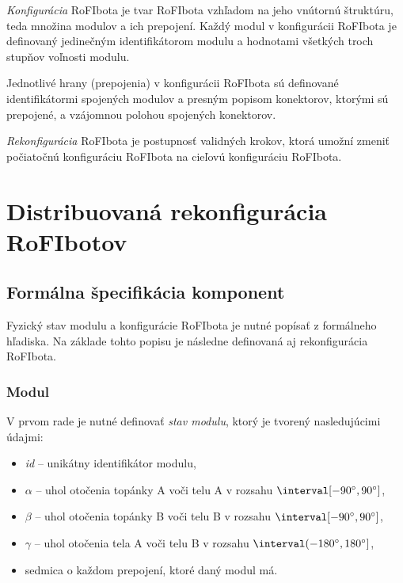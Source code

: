 \documentclass[
  digital, %
  oneside, %
  table,   %
  lof,     %
  nolot,     %
]{fithesis3}
\begin{document}
\textit{Konfigurácia} RoFIbota je tvar RoFIbota vzhľadom na jeho vnútornú štruktúru, teda množina modulov a ich prepojení. Každý modul v konfigurácii RoFIbota je definovaný jedinečným identifikátorom modulu a hodnotami všetkých troch stupňov voľnosti modulu. 

Jednotlivé hrany (prepojenia) v konfigurácii RoFIbota sú definované identifikátormi spojených modulov a presným popisom konektorov, ktorými sú prepojené, a vzájomnou polohou spojených konektorov. 

\textit{Rekonfigurácia} RoFIbota je postupnosť validných krokov, ktorá u\-mož\-ní zmeniť počiatočnú konfiguráciu RoFIbota na cieľovú konfiguráciu RoFIbota. 






\chapter{Distribuovaná rekonfigurácia RoFIbotov}
\section{Formálna špecifikácia komponent}
\label{sec:formalSpec}
Fyzický stav modulu a konfigurácie RoFIbota je nutné popísať z formálneho hľadiska. Na základe tohto popisu je následne definovaná aj rekonfigurácia RoFIbota. 

\subsection{Modul}
\label{sec:formalSpecModul}
V prvom rade je nutné definovať \textit{stav modulu}, ktorý je tvorený nasledujúcimi údajmi: 
\begin{itemize}
    \item \textit{id} -- unikátny identifikátor modulu, 
    \item $\alpha$ -- uhol otočenia topánky A voči telu A v rozsahu $\interval[{-90\degree, 90\degree}]$,
    \item $\beta$ -- uhol otočenia topánky B voči telu B v rozsahu $\interval[{-90\degree, 90\degree}]$,
    \item $\gamma$ -- uhol otočenia tela A voči telu B v rozsahu $\interval({-180\degree, 180\degree}]$,
    \item sedmica o každom prepojení, ktoré daný modul má. 
\end{itemize} 
\end{document}
